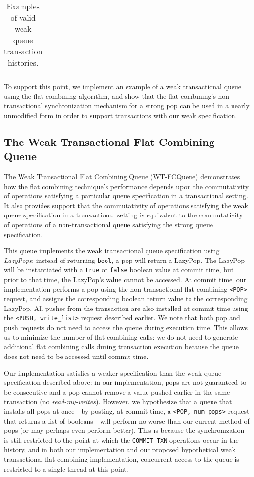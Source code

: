 \begin{table}[H]
\begin{tabular}{|l|l|}
    \end{tabular}
    \caption[Examples of valid weak queue transaction histories.]{Examples of valid weak queue transaction histories.}
    \label{tab:txnal_weakq_commute}
    \end{table}

To support this point, we implement an example of a weak transactional queue using the flat combining algorithm, and show that the flat combining's non-transactional synchronization mechanism for a strong pop can be used in a nearly unmodified form in order to support transactions with our weak specification.


\subsection{The Weak Transactional Flat Combining Queue}
The Weak Transactional Flat Combining Queue (WT-FCQueue) demonstrates how the flat combining technique's performance depends upon the commutativity of operations satisfying a particular queue specification in a transactional setting. It also provides support that the commutativity of operations satisfying the weak queue specification in a transactional setting is equivalent to the commutativity of operations of a non-transactional queue satisfying the strong queue specification.

This queue implements the weak transactional queue specification using \emph{LazyPops}: instead of returning \texttt{bool}, a pop will return a LazyPop. The LazyPop will be instantiated with a \texttt{true} or \texttt{false} boolean value at commit time, but prior to that time, the LazyPop's value cannot be accessed.
At commit time, our implementation performs a pop using the non-transactional flat combining \texttt{<POP>} request, and assigns the corresponding boolean return value to the corresponding LazyPop. All pushes from the transaction are also installed at commit time using the \texttt{<PUSH, write\_list>} request described earlier. We note that both pop and push requests do not need to access the queue during execution time. This allows us to minimize the number of flat combining calls: we do not need to generate additional flat combining calls during transaction execution because the queue does not need to be accessed until commit time.

Our implementation satisfies a weaker specification than the weak queue specification described above: in our implementation, pops are not guaranteed to be consecutive and a pop cannot remove a value pushed earlier in the same transaction (no \emph{read-my-writes}). However, we hypothesize that a queue that installs all pops at once---by posting, at commit time, a \texttt{<POP, num\_pops>} request that returns a list of booleans---will perform no worse than our current method of pops (or may perhaps even perform better). This is because the synchronization is still restricted to the point at which the \texttt{COMMIT\_TXN} operations occur in the history, and in both our implementation and our proposed hypothetical weak transactional flat combining implementation, concurrent access to the queue is restricted to a single thread at this point.

